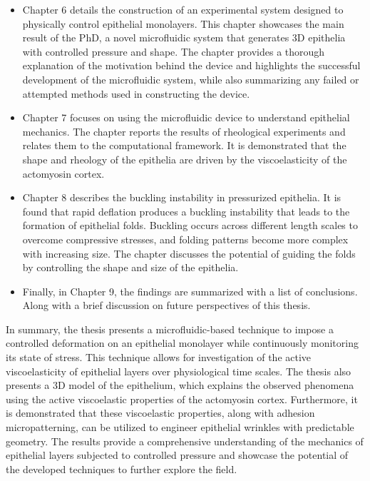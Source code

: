 \begin{itemize}
\item Chapter 6 details the construction of an experimental system designed to physically control epithelial monolayers. This chapter showcases the main result of the PhD, a novel microfluidic system that generates 3D epithelia with controlled pressure and shape. The chapter provides a thorough explanation of the motivation behind the device and highlights the successful development of the microfluidic system, while also summarizing any failed or attempted methods used in constructing the device.  
\item Chapter 7 focuses on using the microfluidic device to understand epithelial mechanics. The chapter reports the results of rheological experiments and relates them to the computational framework. It is demonstrated that the shape and rheology of the epithelia are driven by the viscoelasticity of the actomyosin cortex. 
\item Chapter 8 describes the buckling instability in pressurized epithelia. It is found that rapid deflation produces a buckling instability that leads to the formation of epithelial folds. Buckling occurs across different length scales to overcome compressive stresses, and folding patterns become more complex with increasing size. The chapter discusses the potential of guiding the folds by controlling the shape and size of the epithelia.  
\item Finally, in Chapter 9, the findings are summarized with a list of conclusions. Along with a brief discussion on future perspectives of this thesis.
\end{itemize}

In summary, the thesis presents a microfluidic-based technique to impose a controlled deformation on an epithelial monolayer while continuously monitoring its state of stress. This technique allows for investigation of the active viscoelasticity of epithelial layers over physiological time scales. The thesis also presents a 3D model of the epithelium, which explains the observed phenomena using the active viscoelastic properties of the actomyosin cortex. Furthermore, it is demonstrated that these viscoelastic properties, along with adhesion micropatterning, can be utilized to engineer epithelial wrinkles with predictable geometry. The results provide a comprehensive understanding of the mechanics of epithelial layers subjected to controlled pressure and showcase the potential of the developed techniques to further explore the field.
